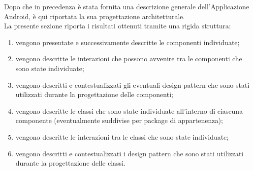     Dopo che in precedenza è stata fornita una descrizione generale dell'Applicazione Android, è qui riportata la sua progettazione architetturale.\\
    La presente sezione riporta i risultati ottenuti tramite una rigida struttura:
    \begin{enumerate}
        \item vengono presentate e successivamente descritte le componenti individuate;
        \item vengono descritte le interazioni che possono avvenire tra le componenti che sono state individuate;
        \item vengono descritti e contestualizzati gli eventuali design pattern che sono stati utilizzati durante la progettazione delle componenti;
        \item vengono descritte le classi che sono state individuate all'interno di ciascuna componente (eventualmente suddivise per package di appartenenza);
        \item vengono descritte le interazioni tra le classi che sono state individuate;
        \item vengono descritti e contestualizzati i design pattern che sono stati utilizzati durante la progettazione delle classi.
    \end{enumerate}
	
